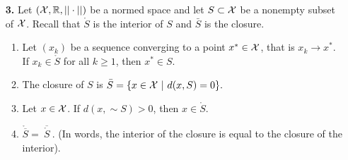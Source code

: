 \documentclass[letterpaper]{article}
\newcommand{\real}{\mathbb R}  %
\begin{document}
\begin{enumerate}
%

\newpage

\item[{\bf 3.}]  Let $({\cal X}, \real, ||\cdot||)$ be a normed space and let $S \subset {\cal X}$ be a nonempty subset of ${\cal X}$. Recall that $\mathring{S}$ is the interior of $S$ and $\bar{S}$ is the closure.
\begin{enumerate}
\setlength{\itemsep}{.15in}
\renewcommand{\labelenumi}{(\alph{enumi})}
\setlength{\itemsep}{.1in}
\item Let $(x_k)$ be a sequence converging to a point $x^*\in {\cal X}$, that is $x_k\to x^*$. If $x_k \in \mathring{S}$ for all $k \ge 1$, then $x^* \in {S}.$
\item The closure of $S$ is $\bar{S} = \{x\in {\cal X}~|~ d(x,S)=0\}. $
\item Let $x\in {\cal X}$. If $d(x,\sim S)>0$, then $x\in \mathring{S}$.
\item $\mathring{\overline{S}} = \overline{~\mathring{S}~}. $ (In words, the interior of the closure is equal to the closure of the interior).
\end{enumerate}






\end{enumerate}
\end{document}
